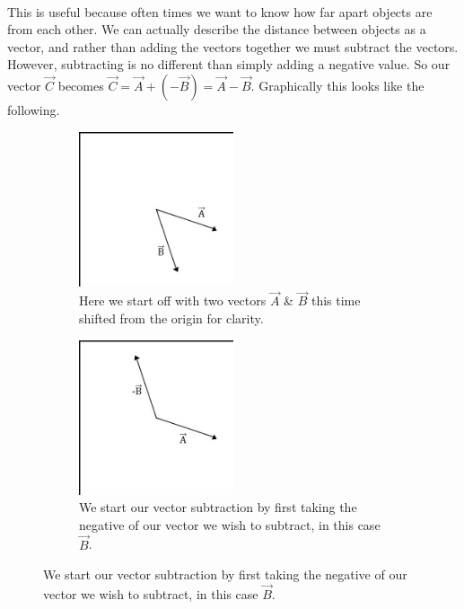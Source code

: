 \documentclass[12pt, letterpaper]{report}
\begin{document}
		\paragraph{} This is useful because often times we want to know how far apart objects are from each other. We can actually describe the distance between objects as a vector, and rather than adding the vectors together we must subtract the vectors. However, subtracting is no different than simply adding a negative value. So our vector $\vec{C}$ becomes $\vec{C} = \vec{A} + (-\vec{B}) = \vec{A} - \vec{B}$. Graphically this looks like the following.
		\begin{figure}[h]
		\begin{subfigure}{0.5\textwidth}
		\centering
		\includegraphics[width=0.5\textwidth]{Processing Images/VectorAddition/2Vect.jpg}
		\caption{Here we start off with two vectors $\vec{A}$ \& $\vec{B}$ this time shifted from the origin for clarity.}
		\end{subfigure}\hspace{0.15cm}
		\begin{subfigure}{0.5\textwidth}
		\centering
		\includegraphics[width=0.5\textwidth]{Processing Images/VectorAddition/2VecNeg.jpg}
		\caption{We start our vector subtraction by first taking the negative of our vector we wish to subtract, in this case $\vec{B}$.}

\end{subfigure}
\end{figure}
\end{document}

